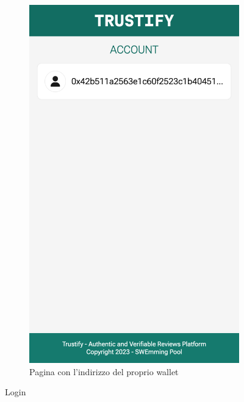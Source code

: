 \begin{figure}[t]
\begin{subfigure}{0.33\textwidth}
    \includegraphics[width=\linewidth]{src/img/account.png}
      \caption{Pagina con l'indirizzo del proprio wallet}\label{fig:account}
    \end{subfigure}

    \caption{Login}\label{fig:login}
\end{figure}



